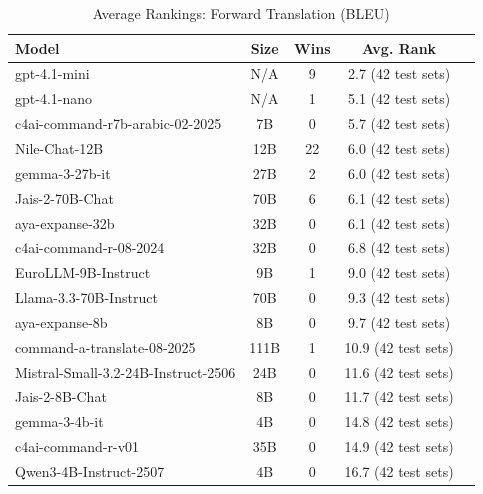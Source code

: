 \begin{table}[htbp]
\centering
\caption{Average Rankings: Forward Translation (BLEU)}
\label{tab:avg_rankings_bleu}
\begin{tabular}{l@{\hspace{3pt}}c@{\hspace{3pt}}c@{\hspace{3pt}}c@{\hspace{3pt}}c}
\toprule
Model & Size & Wins & Avg. Rank \\
\midrule
gpt-4.1-mini & N/A & 9 & 2.7 (42 test sets) \\
gpt-4.1-nano & N/A & 1 & 5.1 (42 test sets) \\
c4ai-command-r7b-arabic-02-2025 & 7B & 0 & 5.7 (42 test sets) \\
Nile-Chat-12B & 12B & 22 & 6.0 (42 test sets) \\
gemma-3-27b-it & 27B & 2 & 6.0 (42 test sets) \\
Jais-2-70B-Chat & 70B & 6 & 6.1 (42 test sets) \\
aya-expanse-32b & 32B & 0 & 6.1 (42 test sets) \\
c4ai-command-r-08-2024 & 32B & 0 & 6.8 (42 test sets) \\
EuroLLM-9B-Instruct & 9B & 1 & 9.0 (42 test sets) \\
Llama-3.3-70B-Instruct & 70B & 0 & 9.3 (42 test sets) \\
aya-expanse-8b & 8B & 0 & 9.7 (42 test sets) \\
command-a-translate-08-2025 & 111B & 1 & 10.9 (42 test sets) \\
Mistral-Small-3.2-24B-Instruct-2506 & 24B & 0 & 11.6 (42 test sets) \\
Jais-2-8B-Chat & 8B & 0 & 11.7 (42 test sets) \\
gemma-3-4b-it & 4B & 0 & 14.8 (42 test sets) \\
c4ai-command-r-v01 & 35B & 0 & 14.9 (42 test sets) \\
Qwen3-4B-Instruct-2507 & 4B & 0 & 16.7 (42 test sets) \\
\bottomrule
\end{tabular}
\end{table}